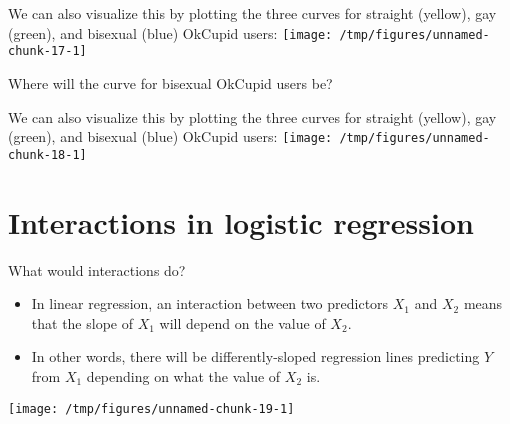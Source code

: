 \documentclass{beamer}\usepackage[]{graphicx}\usepackage[]{color}
\makeatletter
\def\maxwidth{ %
  \ifdim\Gin@nat@width>\linewidth
    \linewidth
  \else
    \Gin@nat@width
  \fi
}
\newenvironment{knitrout}{}{} %
\makeatother
\begin{document}
\begin{darkframes}
    \begin{frame}
      We can also visualize this by plotting the three curves for straight (yellow), gay (green), and bisexual (blue) OkCupid users:
\begin{knitrout}
\color{fgcolor}
\texttt{[image: /tmp/figures/unnamed-chunk-17-1]} 

\end{knitrout}
      Where will the curve for bisexual OkCupid users be?
    \end{frame}

    \begin{frame}
      We can also visualize this by plotting the three curves for straight (yellow), gay (green), and bisexual (blue) OkCupid users:
\begin{knitrout}
\color{fgcolor}
\texttt{[image: /tmp/figures/unnamed-chunk-18-1]} 

\end{knitrout}
    \end{frame}

    \section{Interactions in logistic regression}

    \begin{frame}{What would interactions do?}
      \begin{itemize}
        \item In linear regression, an interaction between two predictors $X_1$ and $X_2$ means that the \alert{slope} of $X_1$ will depend on the \alert{value} of $X_2$.
        \item In other words, there will be differently-sloped regression lines predicting $Y$ from $X_1$ depending on what the value of $X_2$ is.
      \end{itemize}
    \end{frame}

    \begin{frame}
\begin{knitrout}
\color{fgcolor}
\texttt{[image: /tmp/figures/unnamed-chunk-19-1]} 

\end{knitrout}
    \end{frame}


\end{darkframes}
\end{document}

